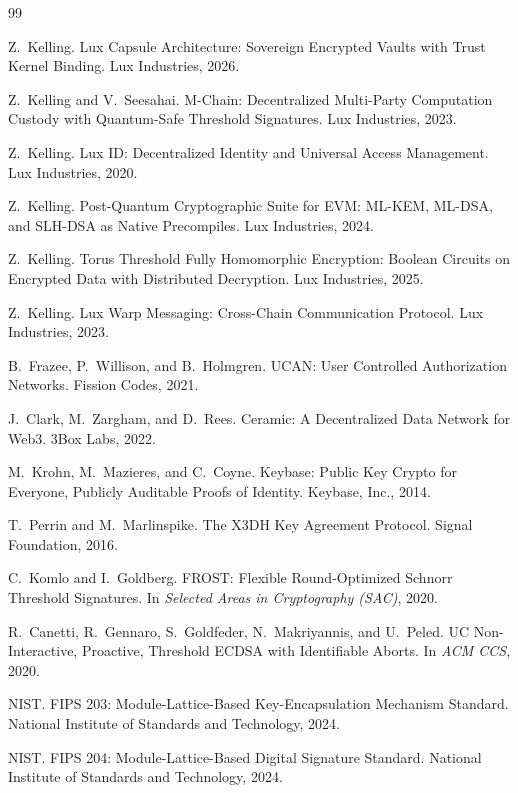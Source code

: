 \begin{thebibliography}{99}

Z.~Kelling.
\newblock Lux Capsule Architecture: Sovereign Encrypted Vaults with Trust Kernel Binding.
\newblock Lux Industries, 2026.

Z.~Kelling and V.~Seesahai.
\newblock M-Chain: Decentralized Multi-Party Computation Custody with Quantum-Safe Threshold Signatures.
\newblock Lux Industries, 2023.

Z.~Kelling.
\newblock Lux ID: Decentralized Identity and Universal Access Management.
\newblock Lux Industries, 2020.

Z.~Kelling.
\newblock Post-Quantum Cryptographic Suite for EVM: ML-KEM, ML-DSA, and SLH-DSA as Native Precompiles.
\newblock Lux Industries, 2024.

Z.~Kelling.
\newblock Torus Threshold Fully Homomorphic Encryption: Boolean Circuits on Encrypted Data with Distributed Decryption.
\newblock Lux Industries, 2025.

Z.~Kelling.
\newblock Lux Warp Messaging: Cross-Chain Communication Protocol.
\newblock Lux Industries, 2023.

B.~Frazee, P.~Willison, and B.~Holmgren.
\newblock UCAN: User Controlled Authorization Networks.
\newblock Fission Codes, 2021.

J.~Clark, M.~Zargham, and D.~Rees.
\newblock Ceramic: A Decentralized Data Network for Web3.
\newblock 3Box Labs, 2022.

M.~Krohn, M.~Mazieres, and C.~Coyne.
\newblock Keybase: Public Key Crypto for Everyone, Publicly Auditable Proofs of Identity.
\newblock Keybase, Inc., 2014.

T.~Perrin and M.~Marlinspike.
\newblock The X3DH Key Agreement Protocol.
\newblock Signal Foundation, 2016.

C.~Komlo and I.~Goldberg.
\newblock FROST: Flexible Round-Optimized Schnorr Threshold Signatures.
\newblock In \emph{Selected Areas in Cryptography (SAC)}, 2020.

R.~Canetti, R.~Gennaro, S.~Goldfeder, N.~Makriyannis, and U.~Peled.
\newblock UC Non-Interactive, Proactive, Threshold ECDSA with Identifiable Aborts.
\newblock In \emph{ACM CCS}, 2020.

NIST.
\newblock FIPS 203: Module-Lattice-Based Key-Encapsulation Mechanism Standard.
\newblock National Institute of Standards and Technology, 2024.

NIST.
\newblock FIPS 204: Module-Lattice-Based Digital Signature Standard.
\newblock National Institute of Standards and Technology, 2024.

\end{thebibliography}

